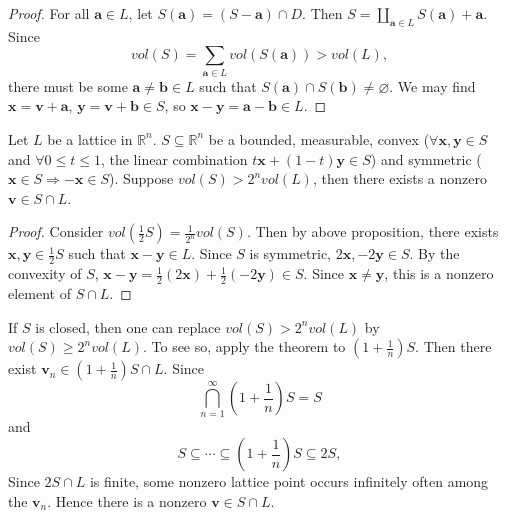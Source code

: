 \begin{proof}
    For all $\mathbf{a}\in L$, let $S(\mathbf{a})=(S-\mathbf{a})\cap D$. Then $S=\coprod\limits_{\mathbf{a}\in L}S(\mathbf{a})+\mathbf{a}$. Since 
    \[
    vol(S)=\sum_{\mathbf{a}\in L}vol(S(\mathbf{a}))>vol(L),
    \]
    there must be some $\mathbf{a}\neq \mathbf{b}\in L$ such that $S(\mathbf{a})\cap S(\mathbf{b})\neq \varnothing$. We may find $\mathbf{x}=\mathbf{v}+\mathbf{a}$, $\mathbf{y}=\mathbf{v}+\mathbf{b}\in S$, so $\mathbf{x}-\mathbf{y}=\mathbf{a}-\mathbf{b}\in L$. 
\end{proof}

\begin{theorem}\label{thm-convexBody}
    Let $L$ be a lattice in $\mathbb{R}^{n}$. $S\subseteq \mathbb{R}^{n}$ be a bounded, measurable, convex ($\forall \mathbf{x},\mathbf{y}\in S$ and $\forall 0\leq t\leq 1$, the linear combination $t\mathbf{x}+(1-t)\mathbf{y}\in S$) and symmetric ($\mathbf{x}\in S\Rightarrow -\mathbf{x}\in S$). Suppose $vol(S)>2^{n}vol(L)$, then there exists a nonzero $\mathbf{v}\in S\cap L$. 
\end{theorem}

\begin{proof}
    Consider $vol(\frac{1}{2}S)=\frac{1}{2^{n}}vol(S)$. Then by above proposition, there exists $\mathbf{x},\mathbf{y}\in \frac{1}{2}S$ such that $\mathbf{x}-\mathbf{y}\in L$. Since $S$ is symmetric, $2\mathbf{x},-2\mathbf{y}\in S$. By the convexity of $S$, $\mathbf{x}-\mathbf{y}=\frac{1}{2}(2\mathbf{x})+\frac{1}{2}(-2\mathbf{y})\in S$. Since $\mathbf{x}\neq\mathbf{y}$, this is a nonzero element of $S\cap L$. 
\end{proof}

\begin{remark}
    If $S$ is closed, then one can replace $vol(S)>2^{n}vol(L)$ by $vol(S)\geq 2^{n}vol(L)$. To see so, apply the theorem to $(1+\frac{1}{n})S$. Then there exist $\mathbf{v}_{n}\in (1+\frac{1}{n})S\cap L$. Since 
    \[
    \bigcap_{n=1}^{\infty}(1+\frac{1}{n})S=S
    \] 
    and 
    \[
    S\subseteq \cdots\subseteq (1+\frac{1}{n})S\subseteq 2S, 
    \]
    Since $2S\cap L$ is finite, some nonzero lattice point occurs infinitely often among the $\mathbf{v}_n$. Hence there is a nonzero $\mathbf{v}\in S\cap L$. 
\end{remark}

